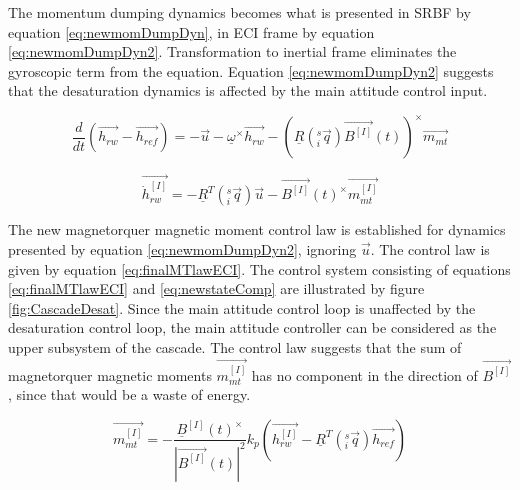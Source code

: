 The momentum dumping dynamics becomes what is presented in SRBF by equation \ref{eq:newmomDumpDyn}, in ECI frame by equation \ref{eq:newmomDumpDyn2}. Transformation to inertial frame eliminates the gyroscopic term from the equation. Equation \ref{eq:newmomDumpDyn2} suggests that the desaturation dynamics is affected by the main attitude control input.

\begin{equation}
\label{eq:newmomDumpDyn}
\frac{d}{dt}(\vec{h_{rw}} - \vec{h_{ref}}) = -\vec{u} - \underline{\omega}^\times\vec{h_{rw}} - \left( \underline{R}(^s_i\vec{ q})  \vec{B^{[I]}}(t)\right)^\times \vec{m_{mt}}
\end{equation}

\begin{equation}
\label{eq:newmomDumpDyn2}
\vec{\dot{h}_{rw}^{[I]}} = -\underline{R}^T(^s_i\vec{ q})\vec{u}  - \vec{B^{[I]}}(t)^\times \vec{m_{mt}^{[I]}}
\end{equation}


%

The new magnetorquer magnetic moment control law is established for dynamics presented by equation \ref{eq:newmomDumpDyn2}, ignoring $\vec{u}$. The control law is given by equation \ref{eq:finalMTlawECI}. The control system consisting of equations \ref{eq:finalMTlawECI} and \ref{eq:newstateComp} are illustrated by figure \ref{fig:CascadeDesat}. Since the main attitude control loop is unaffected by the desaturation control loop, the main attitude controller can be considered as the upper subsystem of the cascade. The control law suggests that the sum of magnetorquer magnetic moments $\vec{m_{mt}^{[I]}} $ has no component in the direction of $\vec{B^{[I]}}$, since that would be a waste of energy.

\begin{equation}
\vec{m_{mt}^{[I]}} 
= - \frac{\underline{B}^{[I]}(t)^\times} {|\vec{B^{[I]}}(t) |^2} k_p\left(\vec{h_{rw}^{[I]}} - \underline{R}^T(^s_i\vec{ q})\vec{h_{ref}} \right)
\label{eq:finalMTlawECI}
\end{equation}


